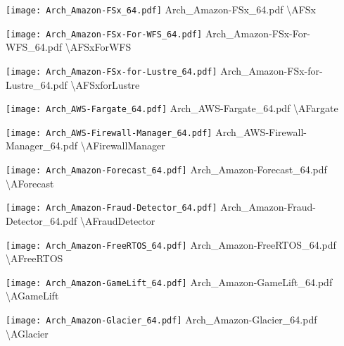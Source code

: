  {\texttt{[image: Arch\_Amazon-FSx\_64.pdf]}} {Arch\_Amazon-FSx\_64.pdf} {{\textbackslash}AFSx}

 {\texttt{[image: Arch\_Amazon-FSx-For-WFS\_64.pdf]}} {Arch\_Amazon-FSx-For-WFS\_64.pdf} {{\textbackslash}AFSxForWFS}

 {\texttt{[image: Arch\_Amazon-FSx-for-Lustre\_64.pdf]}} {Arch\_Amazon-FSx-for-Lustre\_64.pdf} {{\textbackslash}AFSxforLustre}

 {\texttt{[image: Arch\_AWS-Fargate\_64.pdf]}} {Arch\_AWS-Fargate\_64.pdf} {{\textbackslash}AFargate}

 {\texttt{[image: Arch\_AWS-Firewall-Manager\_64.pdf]}} {Arch\_AWS-Firewall-Manager\_64.pdf} {{\textbackslash}AFirewallManager}

 {\texttt{[image: Arch\_Amazon-Forecast\_64.pdf]}} {Arch\_Amazon-Forecast\_64.pdf} {{\textbackslash}AForecast}

 {\texttt{[image: Arch\_Amazon-Fraud-Detector\_64.pdf]}} {Arch\_Amazon-Fraud-Detector\_64.pdf} {{\textbackslash}AFraudDetector}

 {\texttt{[image: Arch\_Amazon-FreeRTOS\_64.pdf]}} {Arch\_Amazon-FreeRTOS\_64.pdf} {{\textbackslash}AFreeRTOS}

 {\texttt{[image: Arch\_Amazon-GameLift\_64.pdf]}} {Arch\_Amazon-GameLift\_64.pdf} {{\textbackslash}AGameLift}

 {\texttt{[image: Arch\_Amazon-Glacier\_64.pdf]}} {Arch\_Amazon-Glacier\_64.pdf} {{\textbackslash}AGlacier}

